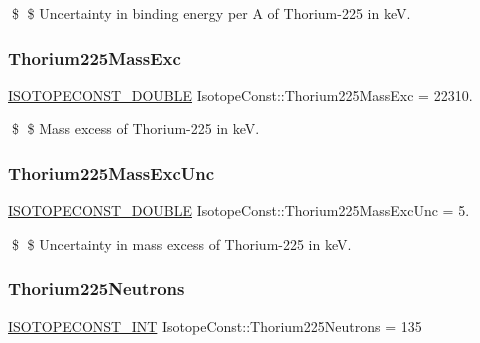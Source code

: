 \$ \$ Uncertainty in binding energy per A of Thorium-\/225 in keV. \mbox{\label{group___isotope_const-_thorium-_th225_ga206369ba8be8cb3f99ea5315c3b7f6e8}} 
\subsubsection{\texorpdfstring{Thorium225\+Mass\+Exc}{Thorium225MassExc}}
{\footnotesize\ttfamily \mbox{\hyperlink{group___isotope_const-_macros_ga8f45a7272ce02c0b4c65c44636ed719a}{I\+S\+O\+T\+O\+P\+E\+C\+O\+N\+S\+T\+\_\+\+D\+O\+U\+B\+LE}} Isotope\+Const\+::\+Thorium225\+Mass\+Exc = 22310.}

\$ \$ Mass excess of Thorium-\/225 in keV. \mbox{\label{group___isotope_const-_thorium-_th225_gae7c3c23cf8c676f0d70e8284600576dc}} 
\subsubsection{\texorpdfstring{Thorium225\+Mass\+Exc\+Unc}{Thorium225MassExcUnc}}
{\footnotesize\ttfamily \mbox{\hyperlink{group___isotope_const-_macros_ga8f45a7272ce02c0b4c65c44636ed719a}{I\+S\+O\+T\+O\+P\+E\+C\+O\+N\+S\+T\+\_\+\+D\+O\+U\+B\+LE}} Isotope\+Const\+::\+Thorium225\+Mass\+Exc\+Unc = 5.}

\$ \$ Uncertainty in mass excess of Thorium-\/225 in keV. \mbox{\label{group___isotope_const-_thorium-_th225_ga93bf586f8a59054fb4d671cb59f64573}} 
\subsubsection{\texorpdfstring{Thorium225\+Neutrons}{Thorium225Neutrons}}
{\footnotesize\ttfamily \mbox{\hyperlink{group___isotope_const-_macros_ga5f18360b3e99483a35c32d789e62621c}{I\+S\+O\+T\+O\+P\+E\+C\+O\+N\+S\+T\+\_\+\+I\+NT}} Isotope\+Const\+::\+Thorium225\+Neutrons = 135}

